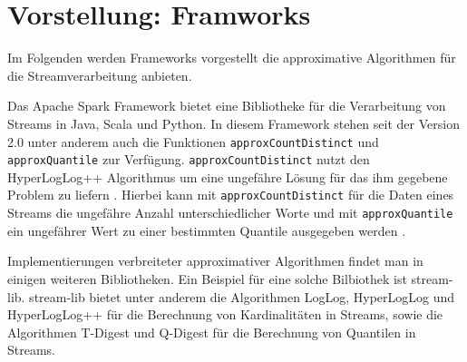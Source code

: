 \section{Vorstellung: Framworks}
Im Folgenden werden Frameworks vorgestellt die approximative Algorithmen für die Streamverarbeitung anbieten.

Das Apache Spark Framework bietet eine Bibliotheke für die Verarbeitung von Streams in Java, Scala und Python. 
In diesem Framework stehen seit der Version 2.0 unter anderem auch die Funktionen \texttt{approxCountDistinct} und \texttt{approxQuantile} zur Verfügung. 
\texttt{approxCountDistinct} nutzt den HyperLogLog++ Algorithmus um eine ungefähre Lösung für das ihm gegebene Problem zu liefern \cite{hunter2016}.
Hierbei kann mit \texttt{approxCountDistinct} für die Daten eines Streams die ungefähre Anzahl unterschiedlicher Worte 
und mit \texttt{approxQuantile} ein ungefährer Wert zu einer bestimmten Quantile ausgegeben werden \cite{hunter2016}. 


Implementierungen verbreiteter approximativer Algorithmen findet man in einigen weiteren Bibliotheken. 
Ein Beispiel für eine solche Bilbiothek ist stream-lib.
stream-lib bietet unter anderem die Algorithmen LogLog, 
HyperLogLog und HyperLogLog++ für die Berechnung von Kardinalitäten in Streams, 
sowie die Algorithmen T-Digest und Q-Digest für die Berechnung von Quantilen in Streams. 


